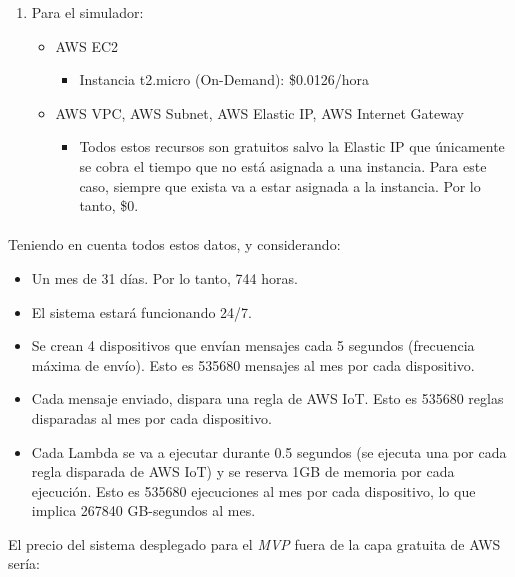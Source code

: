 \documentclass[../../memoria.tex]{subfiles}
\begin{document}
\begin{enumerate}
    \item Para el simulador:
          \begin{itemize}
              \item AWS EC2 \cite{awsec2pricing}
                    \begin{itemize}
                        \item Instancia t2.micro (On-Demand): \$0.0126/hora
                    \end{itemize}
              \item AWS VPC, AWS Subnet, AWS Elastic IP, AWS Internet Gateway \cite{awsvpcpricing}
                    \begin{itemize}
                        \item Todos estos recursos son gratuitos salvo la Elastic IP que únicamente se cobra el tiempo que no está asignada a una instancia. Para este caso, siempre que exista va a estar asignada a la instancia. Por lo tanto, \$0.
                    \end{itemize}
          \end{itemize}
\end{enumerate}

\paragraph{}
Teniendo en cuenta todos estos datos, y considerando:
\begin{itemize}
    \item Un mes de 31 días. Por lo tanto, 744 horas.
    \item El sistema estará funcionando 24/7.
    \item Se crean 4 dispositivos que envían mensajes cada 5 segundos (frecuencia máxima de envío). Esto es 535680 mensajes al mes por cada dispositivo.
    \item Cada mensaje enviado, dispara una regla de AWS IoT. Esto es 535680 reglas disparadas al mes por cada dispositivo.
    \item Cada Lambda se va a ejecutar durante 0.5 segundos (se ejecuta una por cada regla disparada de AWS IoT) y se reserva 1GB de memoria por cada ejecución. Esto es 535680 ejecuciones al mes por cada dispositivo, lo que implica 267840 GB-segundos al mes.
\end{itemize}
El precio del sistema desplegado para el \textit{MVP} fuera de la capa gratuita de AWS sería:
\end{document}
